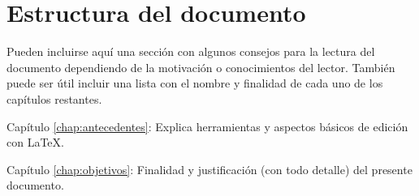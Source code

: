 \section{Estructura del documento}

Pueden incluirse aquí una sección con algunos consejos para la lectura del
documento dependiendo de la motivación o conocimientos del lector.  También
puede ser útil incluir una lista con el nombre y finalidad de cada uno de los
capítulos restantes.


\begin{definitionlist}
\item[Capítulo \ref{chap:antecedentes}: \nameref{chap:antecedentes}] Explica herramientas
  y aspectos básicos de edición con \LaTeX.
\item[Capítulo \ref{chap:objetivos}: \nameref{chap:objetivos}] Finalidad y justificación
  (con todo detalle) del presente documento.
\end{definitionlist}



